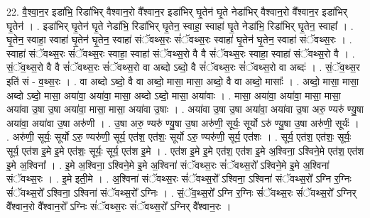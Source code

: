 \documentclass[17pt]{extarticle}
\begin{document}
22. वै॒श्वा॒न॒र इडा॑भि॒ रिडा॑भिर् वैश्वान॒रो वै᳚श्वान॒र इडा॑भिर् घृ॒तेन॑ घृ॒ते नेडा॑भिर् वैश्वान॒रो वै᳚श्वान॒र इडा॑भिर् घृ॒तेन॑ । . इडा॑भिर् घृ॒तेन॑ घृ॒ते नेडा॑भि॒ रिडा॑भिर् घृ॒तेन॒ स्वाहा॒ स्वाहा॑ घृ॒ते नेडा॑भि॒ रिडा॑भिर् घृ॒तेन॒ स्वाहा᳚ । . घृ॒तेन॒ स्वाहा॒ स्वाहा॑ घृ॒तेन॑ घृ॒तेन॒ स्वाहा॑ संॅवथ्स॒रः सं॑ॅवथ्स॒रः स्वाहा॑ घृ॒तेन॑ घृ॒तेन॒ स्वाहा॑ संॅवथ्स॒रः । . स्वाहा॑ संॅवथ्स॒रः सं॑ॅवथ्स॒रः स्वाहा॒ स्वाहा॑ संॅवथ्स॒रो वै वै सं॑ॅवथ्स॒रः स्वाहा॒ स्वाहा॑ संॅवथ्स॒रो वै । . सं॒ॅव॒थ्स॒रो वै वै सं॑ॅवथ्स॒रः सं॑ॅवथ्स॒रो वा अब्दो ऽब्दो॒ वै सं॑ॅवथ्स॒रः सं॑ॅवथ्स॒रो वा अब्दः॑ । . सं॒ॅव॒थ्स॒र इति॑ सं - व॒थ्स॒रः । . वा अब्दो ऽब्दो॒ वै वा अब्दो॒ मासा॒ मासा॒ अब्दो॒ वै वा अब्दो॒ मासाः᳚ । . अब्दो॒ मासा॒ मासा॒ अब्दो ऽब्दो॒ मासा॒ अया॑वा॒ अया॑वा॒ मासा॒ अब्दो ऽब्दो॒ मासा॒ अया॑वाः । . मासा॒ अया॑वा॒ अया॑वा॒ मासा॒ मासा॒ अया॑वा उ॒षा उ॒षा अया॑वा॒ मासा॒ मासा॒ अया॑वा उ॒षाः । . अया॑वा उ॒षा उ॒षा अया॑वा॒ अया॑वा उ॒षा अरु॒ ण्यरु॑ ण्यु॒षा अया॑वा॒ अया॑वा उ॒षा अरु॑णी । . उ॒षा अरु॒ ण्यरु॑ ण्यु॒षा उ॒षा अरु॑णी॒ सूर्यः॒ सूर्यो ऽरु॑ ण्यु॒षा उ॒षा अरु॑णी॒ सूर्यः॑ । . अरु॑णी॒ सूर्यः॒ सूर्यो ऽरु॒ ण्यरु॑णी॒ सूर्य॒ एत॑श॒ एत॑शः॒ सूर्यो ऽरु॒ ण्यरु॑णी॒ सूर्य॒ एत॑शः । . सूर्य॒ एत॑श॒ एत॑शः॒ सूर्यः॒ सूर्य॒ एत॑श इ॒मे इ॒मे एत॑शः॒ सूर्यः॒ सूर्य॒ एत॑श इ॒मे । . एत॑श इ॒मे इ॒मे एत॑श॒ एत॑श इ॒मे अ॒श्विना॒ ऽश्विने॒मे एत॑श॒ एत॑श इ॒मे अ॒श्विना᳚ । . इ॒मे अ॒श्विना॒ ऽश्विने॒मे इ॒मे अ॒श्विना॑ संॅवथ्स॒रः सं॑ॅवथ्स॒रो᳚ ऽश्विने॒मे इ॒मे अ॒श्विना॑ संॅवथ्स॒रः । . इ॒मे इती॒मे । . अ॒श्विना॑ संॅवथ्स॒रः सं॑ॅवथ्स॒रो᳚ ऽश्विना॒ ऽश्विना॑ संॅवथ्स॒रो᳚ ऽग्नि र॒ग्निः सं॑ॅवथ्स॒रो᳚ ऽश्विना॒ ऽश्विना॑ संॅवथ्स॒रो᳚ ऽग्निः । . सं॒ॅव॒थ्स॒रो᳚ ऽग्नि र॒ग्निः सं॑ॅवथ्स॒रः सं॑ॅवथ्स॒रो᳚ ऽग्निर् वै᳚श्वान॒रो वै᳚श्वान॒रो᳚ ऽग्निः सं॑ॅवथ्स॒रः सं॑ॅवथ्स॒रो᳚ ऽग्निर् वै᳚श्वान॒रः । \newline
\end{document}
